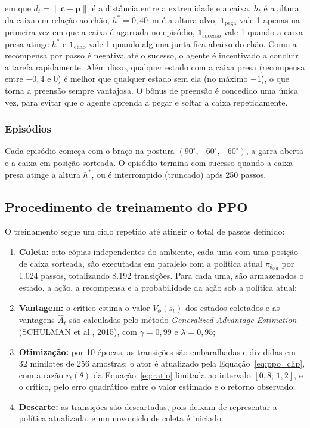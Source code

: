 \documentclass[conference]{IEEEtran}
\begin{document}
\noindent em que $d_t = \lVert \mathbf{c} - \mathbf{p} \rVert$ é a distância entre a extremidade e a caixa, $h_t$ é a altura da caixa em relação ao chão, $h^{*} = 0{,}40$~m é a altura-alvo, $\mathbf{1}_{\text{pega}}$ vale 1 apenas na primeira vez em que a caixa é agarrada no episódio, $\mathbf{1}_{\text{sucesso}}$ vale 1 quando a caixa presa atinge $h^{*}$ e $\mathbf{1}_{\text{chão}}$ vale 1 quando alguma junta fica abaixo do chão. Como a recompensa por passo é negativa até o sucesso, o agente é incentivado a concluir a tarefa rapidamente. Além disso, qualquer estado com a caixa presa (recompensa entre $-0{,}4$ e $0$) é melhor que qualquer estado sem ela (no máximo $-1$), o que torna a preensão sempre vantajosa. O bônus de preensão é concedido uma única vez, para evitar que o agente aprenda a pegar e soltar a caixa repetidamente.

\subsubsection{Episódios}

Cada episódio começa com o braço na postura $(90^\circ, -60^\circ, -60^\circ)$, a garra aberta e a caixa em posição sorteada. O episódio termina com sucesso quando a caixa presa atinge a altura $h^{*}$, ou é interrompido (truncado) após 250 passos.

\subsection{Procedimento de treinamento do PPO}

O treinamento segue um ciclo repetido até atingir o total de passos definido:

\begin{enumerate}
    \item \textbf{Coleta:} oito cópias independentes do ambiente, cada uma com uma posição de caixa sorteada, são executadas em paralelo com a política atual $\pi_{\theta_{\text{old}}}$ por 1.024 passos, totalizando 8.192 transições. Para cada uma, são armazenados o estado, a ação, a recompensa e a probabilidade da ação sob a política atual;
    \item \textbf{Vantagem:} o crítico estima o valor $V_\phi(s_t)$ dos estados coletados e as vantagens $\hat{A}_t$ são calculadas pelo método \textit{Generalized Advantage Estimation} (SCHULMAN et al., 2015), com $\gamma = 0{,}99$ e $\lambda = 0{,}95$;
    \item \textbf{Otimização:} por 10 épocas, as transições são embaralhadas e divididas em 32 minilotes de 256 amostras; o ator é atualizado pela Equação~\eqref{eq:ppo_clip}, com a razão $r_t(\theta)$ da Equação~\eqref{eq:ratio} limitada ao intervalo $[0{,}8;\,1{,}2]$, e o crítico, pelo erro quadrático entre o valor estimado e o retorno observado;
    \item \textbf{Descarte:} as transições são descartadas, pois deixam de representar a política atualizada, e um novo ciclo de coleta é iniciado.
\end{enumerate}
\end{document}
